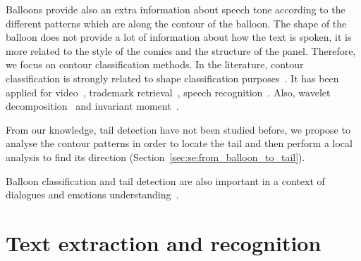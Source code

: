 
Balloons provide also an extra information about speech tone according to the different patterns which are along the contour of the balloon.
The shape of the balloon does not provide a lot of information about how the text is spoken, it is more related to the style of the comics and the structure of the panel.
Therefore, we focus on contour classification methods.
In the literature, contour classification is strongly related to shape classification purposes~\cite{sun2005classification,liu1990partial}.
It has been applied for video~\cite{kuhne2001motion,richter2001contour,bader2009}, trademark retrieval~\cite{leung2002trademark}, speech recognition~\cite{grigoriu1994automatic}.
Also, wavelet decomposition~\cite{tieng1997recognition} and invariant moment~\cite{mukundan1998moment}. 

From our knowledge, tail detection have not been studied before, we propose to analyse the contour patterns in order to locate the tail and then perform a local analysis to find its direction (Section~\ref{sec:se:from_balloon_to_tail}).

Balloon classification and tail detection are also important in a context of dialogues and emotions understanding~\cite{millidge2009comic}.









\section{Text extraction and recognition}
\label{sec:sota:text}

